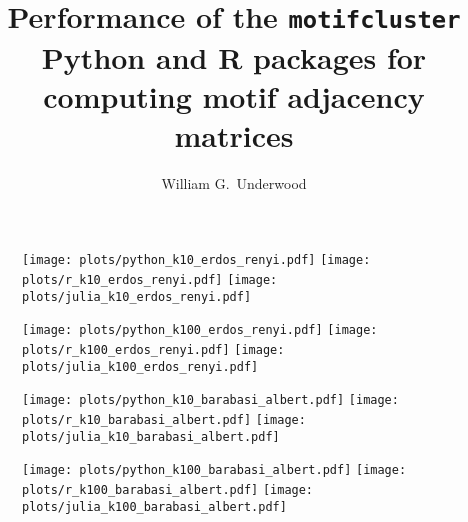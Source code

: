 \documentclass{article}
\author{William G.\ Underwood}
\title{Performance of the \texttt{motifcluster}
  Python and R packages for \\ computing motif adjacency matrices}
\begin{document}
\maketitle

\begin{figure}[H]
  \centering
  \texttt{[image: plots/python\_k10\_erdos\_renyi.pdf]}
  \texttt{[image: plots/r\_k10\_erdos\_renyi.pdf]}
  \texttt{[image: plots/julia\_k10\_erdos\_renyi.pdf]}
\end{figure}

\pagebreak

\begin{figure}[H]
  \centering
  \texttt{[image: plots/python\_k100\_erdos\_renyi.pdf]}
  \texttt{[image: plots/r\_k100\_erdos\_renyi.pdf]}
  \texttt{[image: plots/julia\_k100\_erdos\_renyi.pdf]}
\end{figure}

\pagebreak

\begin{figure}[H]
  \centering
  \texttt{[image: plots/python\_k10\_barabasi\_albert.pdf]}
  \texttt{[image: plots/r\_k10\_barabasi\_albert.pdf]}
  \texttt{[image: plots/julia\_k10\_barabasi\_albert.pdf]}
\end{figure}

\pagebreak

\begin{figure}[H]
  \centering
  \texttt{[image: plots/python\_k100\_barabasi\_albert.pdf]}
  \texttt{[image: plots/r\_k100\_barabasi\_albert.pdf]}
  \texttt{[image: plots/julia\_k100\_barabasi\_albert.pdf]}
\end{figure}

\pagebreak
\end{document}
